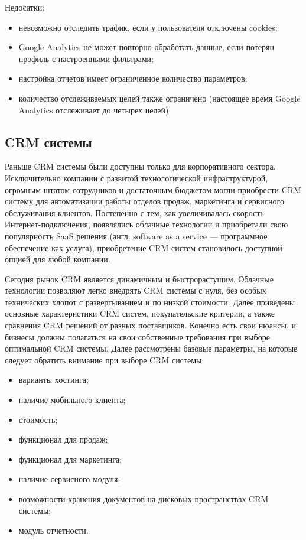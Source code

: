 Недосатки:
\begin{itemize}
\item невозможно отследить трафик, если у пользователя отключены cookies;
\item Google Analytics не может повторно обработать данные, если потерян профиль с настроенными фильтрами;
\item настройка отчетов имеет ограниченное количество параметров;
\item количество отслеживаемых целей также ограничено (настоящее время Google Analytics отслеживает до четырех целей).
\end{itemize}

\subsection{CRM системы}
\label{sub:alternatives:crm}
Раньше CRM системы были доступны только для корпоративного сектора. Исключительно компании с развитой технологической инфраструктурой, огромным штатом сотрудников и достаточным бюджетом могли приобрести CRM систему для автоматизации работы отделов продаж, маркетинга и сервисного обслуживания клиентов.
Постепенно с тем, как увеличивалась скорость Интернет-подключения, появлялись облачные технологии и приобретали свою популярность SaaS решения (англ. software as a service — программное обеспечение как услуга), приобретение CRM систем становилось доступной опцией для любой компании.

Сегодня рынок CRM является динамичным и быстрорастущим. Облачные технологии позволяют легко внедрять CRM системы с нуля, без особых технических хлопот с развертыванием и по низкой стоимости. Далее приведены основные характеристики CRM систем, покупательские критерии, а также сравнения CRM решений от разных поставщиков. Конечно есть свои нюансы, и бизнесы должны полагаться на свои собственные требования при выборе оптимальной CRM системы. Далее рассмотрены базовые параметры, на которые следует обратить внимание при выборе CRM системы:
\begin{itemize}
\item варианты хостинга;
\item наличие мобильного клиента;
\item стоимость;
\item функционал для продаж;
\item функционал для маркетинга;
\item наличие сервисного модуля;
\item возможности хранения документов на дисковых пространствах CRM системы;
\item модуль отчетности.
\end{itemize}

